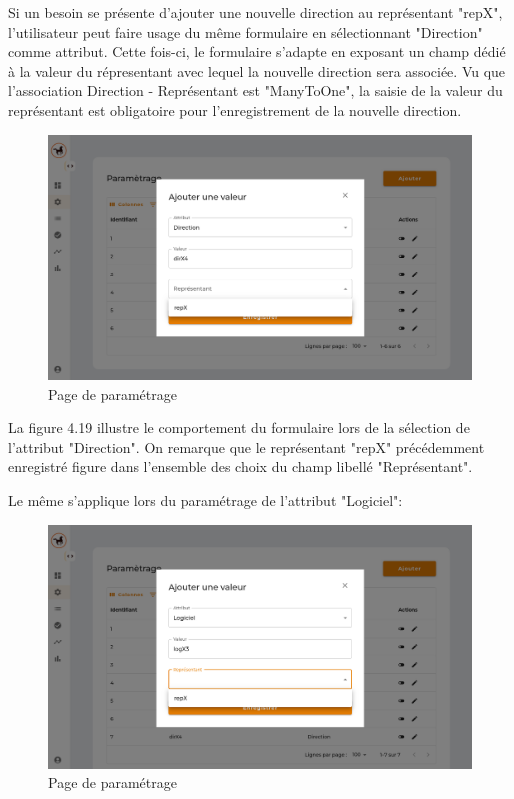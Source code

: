 \noindent Si un besoin se présente d'ajouter une nouvelle direction au représentant "repX", l'utilisateur peut faire usage du même formulaire en sélectionnant "Direction" comme attribut. Cette fois-ci, le formulaire s'adapte en exposant un champ dédié à la valeur du répresentant avec lequel la nouvelle direction sera associée. Vu que l'association Direction -\> Représentant est "ManyToOne", la saisie de la valeur du représentant est obligatoire pour l'enregistrement de la nouvelle direction. 

\begin{figure}[H]
    \centering
    \includegraphics[width=\textwidth]{images/guis/parametrage/form-child1.png}
    \caption{Page de paramétrage}
\end{figure}

\clearpage

\noindent La figure 4.19 illustre le comportement du formulaire lors de la sélection de l'attribut "Direction". On remarque que le représentant "repX" précédemment enregistré figure dans l'ensemble des choix du champ libellé "Représentant". 

\noindent Le même s'applique lors du paramétrage de l'attribut "Logiciel":

\begin{figure}[H]
    \centering
    \includegraphics[width=.8\textwidth]{images/guis/parametrage/form-child2.png}
    \caption{Page de paramétrage}
\end{figure}


